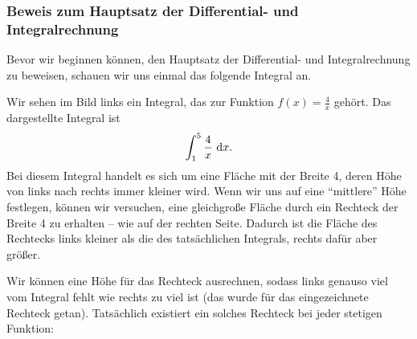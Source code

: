 \documentclass[../../main.tex]{subfiles}
\begin{document}
\subsubsection*{Beweis zum Hauptsatz der Differential- und Integralrechnung}
\label{hdi-beweis}
Bevor wir beginnen können, den Hauptsatz der Differential- und Integralrechnung zu beweisen, schauen wir uns einmal
das folgende Integral an.
\begin{center}
    \begin{multicols}{2}

    \end{multicols}
\end{center}

Wir sehen im Bild links ein Integral, das zur Funktion $f(x)=\frac{4}{x}$ gehört. Das dargestellte Integral ist
\[\int_1^5\frac{4}{x}\mathop{}\mathrm{d} x.\]
Bei diesem Integral handelt es sich um eine Fläche mit der Breite 4, deren Höhe von links nach rechts immer kleiner wird.
Wenn wir uns auf eine \enquote{mittlere} Höhe festlegen, können wir versuchen, eine gleichgroße Fläche durch ein Rechteck
der Breite 4 zu erhalten -- wie auf der rechten Seite. Dadurch ist die Fläche des Rechtecks links kleiner als die
des tatsächlichen Integrals, rechts dafür aber größer. 

Wir können eine Höhe für das Rechteck ausrechnen, sodass
links genauso viel vom Integral fehlt wie rechts zu viel ist (das wurde für das eingezeichnete Rechteck getan).
Tatsächlich existiert ein solches Rechteck bei jeder stetigen Funktion:
\end{document}
